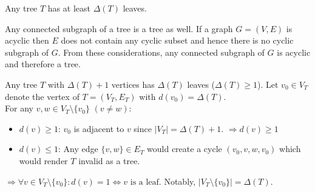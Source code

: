 \documentclass[a4paper]{article}
\begin{document}
	\begin{solution}{1}
		\begin{theorem}{Any tree $T$ has at least $\Delta(T)$ leaves.}
			\begin {lemma}{Any connected subgraph of a tree is a tree as well.}
				If a graph $G = (V, E)$ is acyclic then $E$ does not contain any cyclic subset and hence there is no cyclic subgraph of $G$. From these considerations, any connected subgraph of $G$ is acyclic and therefore a tree.
			\end{lemma}
		
			\begin{lemma}{Any tree $T$ with $\Delta(T)+1$ vertices has $\Delta(T)$ leaves ($\Delta(T) \geq 1$).}
				Let $v_0 \in V_T$ denote the vertex of $T = (V_T, E_T)$ with $d(v_0) = \Delta(T)$.\\
				For any $v, w \in V_T\setminus\{v_0\}$ $(v \neq w)$:
				\begin{itemize}
					\item $d(v) \geq 1$: $v_0$ is adjacent to $v$ since $|V_T| =  \Delta(T)+1$. $\Rightarrow d(v) \geq 1$
					\item $d(v) \leq 1$: Any edge $\{v, w\} \in E_T$ would create a cycle $(v_0, v, w, v_0)$ which would render $T$ invalid as a tree.
				\end{itemize}
				$\Rightarrow \forall v \in V_T\setminus\{v_0\}: d(v) = 1 \Leftrightarrow v \text{ is a leaf}$. Notably, $|V_T\setminus\{v_0\}| = \Delta(T)$.
			\end{lemma}


\end{theorem}
\end{solution}
\end{document}
